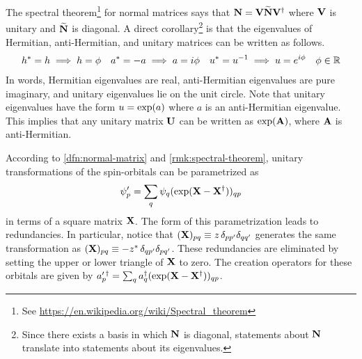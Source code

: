 \documentclass[11pt]{article}
\numberwithin{equation}{section}
\begin{document}
\begin{rmk}
\label{rmk:spectral-theorem}
The spectral theorem\footnote{See \url{https://en.wikipedia.org/wiki/Spectral_theorem}} for normal matrices says that $\mathbf{N}=\mathbf{V}\widetilde{\mathbf{N}}\mathbf{V}^\dagger$ where $\mathbf{V}$ is unitary and $\widetilde{\mathbf{N}}$ is diagonal.
A direct corollary\footnote{Since there exists a basis in which $\mathbf{N}$ is diagonal, statements about $\mathbf{N}$ translate into statements about its eigenvalues.} is that the eigenvalues of Hermitian, anti-Hermitian, and unitary matrices can be written as follows.
\begin{align}
  h^*
=
  h
\implies
  h
=
  \phi 
&&
  a^*
=
-
  a
\implies
  a
=
  i\phi 
&&
  u^*
=
  u^{-1}
\implies
  u
=
  e^{i\phi }
&&
  \phi 
\in
  \mathbb{R}
\end{align}
In words, Hermitian eigenvalues are real, anti-Hermitian eigenvalues are pure imaginary, and unitary eigenvalues lie on the unit circle.
Note that unitary eigenvalues have the form $u=\mathrm{exp}(a)$ where $a$ is an anti-Hermitian eigenvalue.
This implies that any unitary matrix $\mathbf{U}$ can be written as $\mathrm{exp}(\mathbf{A})$, where $\mathbf{A}$ is anti-Hermitian.
\end{rmk}

\begin{rmk}
\label{rmk:spin-orbital-transformation-law}
According to \cref{dfn:normal-matrix} and \cref{rmk:spectral-theorem}, unitary transformations of the spin-orbitals can be parametrized as
\begin{align}
\label{eq:spin-orbital-transformation}
  \psi _p'
=
  \sum_q
  \psi _q
  (\mathrm{exp}(\mathbf{X} - \mathbf{X}^\dagger))_{qp}
\end{align}
in terms of a square matrix $\mathbf{X}$.
The form of this parametrization leads to redundancies.
In particular, notice that $(\mathbf{X})_{pq}\equiv z\,\delta _{pp'}\delta _{qq'}$ generates the same transformation as $(\mathbf{X})_{pq}\equiv -z^*\,\delta _{qp'}\delta _{pq'}$.
These redundancies are eliminated by setting the upper or lower triangle of $\mathbf{X}$ to zero.
The creation operators for these orbitals are given by
$
  a_p^{\prime\,\dagger}
=
  \sum_q
  a_q^\dagger
  (\mathrm{exp}(\mathbf{X} - \mathbf{X}^\dagger))_{qp}
$.
\end{rmk}
\end{document}
